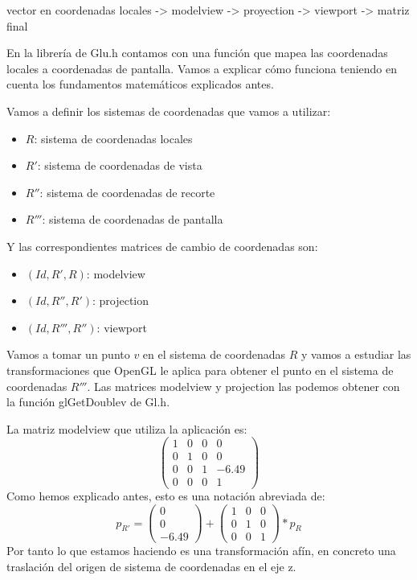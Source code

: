 \documentclass[a4paper,11pt, oneside]{book}
\begin{document}
vector en coordenadas locales -> modelview -> proyection -> viewport -> matriz final

En la librería de Glu.h contamos con una función que mapea las coordenadas locales a coordenadas de pantalla. Vamos a explicar cómo funciona teniendo en cuenta los fundamentos matemáticos explicados antes.

Vamos a definir los sistemas de coordenadas que vamos a utilizar:

\begin{itemize}
	\item $R$: sistema de coordenadas locales
	\item $R'$: sistema de coordenadas de vista
	\item $R''$: sistema de coordenadas de recorte
	\item $R'''$: sistema de coordenadas de pantalla
\end{itemize}

Y las correspondientes matrices de cambio de coordenadas son:

\begin{itemize}
	\item $(Id, R', R)$: modelview
	\item $(Id, R'', R')$: projection
	\item $(Id, R''', R'')$: viewport
\end{itemize}

Vamos a tomar un punto $v$ en el sistema de coordenadas $R$ y vamos a estudiar las transformaciones que OpenGL le aplica para obtener el punto en el sistema de coordenadas $R'''$. Las matrices modelview y projection las podemos obtener con la función glGetDoublev de Gl.h.

La matriz modelview que utiliza la aplicación es:
$$\begin{pmatrix}
	1 & 0 & 0& 0 \\
	0 & 1&0&0 \\
	0&0&1&-6.49 \\
	0&0&0&1
\end{pmatrix}$$
Como hemos explicado antes, esto es una notación abreviada de:
\begin{equation}
p_{R'} = 
\begin{pmatrix}
0\\
0\\
-6.49
\end{pmatrix}
+
\begin{pmatrix}
1&0&0 \\
0&1&0\\
0&0&1
\end{pmatrix}
*p_R
\end{equation}
Por tanto lo que estamos haciendo es una transformación afín, en concreto una traslación del origen de sistema de coordenadas en el eje z.
\end{document}
